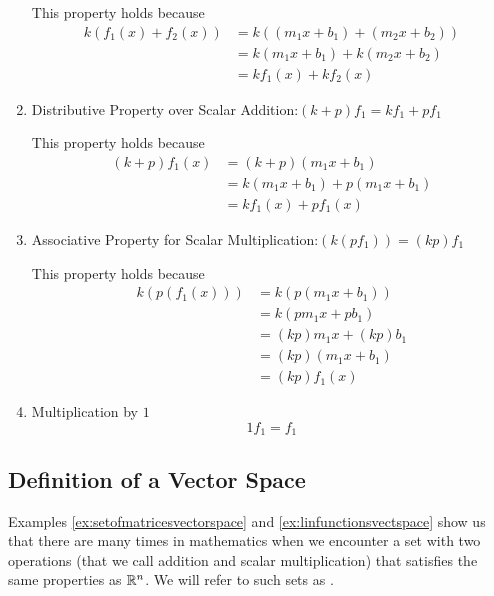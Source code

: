 \documentclass{ximera}
\begin{document}
\begin{example}
\begin{explanation}
\begin{enumerate}
  This property holds because
 \begin{align*}
  k(f_1(x) + f_2(x)) &= k((m_1 x + b_1) + (m_2 x + b_2))\\  &= k(m_1 x + b_1) + k(m_2 x + b_2)\\  &= k f_1(x) + k f_2(x)
  \end{align*}
  
  \item
  Distributive Property over Scalar Addition:\quad $(k+p)f_1=kf_1+pf_1$  
  
  This property holds because
  \begin{align*}(k+p)f_1(x)&= (k+p)(m_1 x + b_1)\\ &=k(m_1 x + b_1) + p(m_1 x + b_1)\\ &= k f_1(x) + p f_1(x)\end{align*}
 
  \item 
  Associative Property for Scalar Multiplication:\quad $(k(pf_1))=(kp)f_1$ 
  
  This property holds because
  \begin{align*}k(p(f_1(x)))&=k(p(m_1 x + b_1))\\&=k(p m_1 x +p b_1)\\ &= (kp) m_1 x + (kp) b_1\\ &= (kp)(m_1 x + b_1)\\&=(kp)f_1(x)\end{align*}
  
  \item 
  Multiplication by $1$ 
  $$1 f_1=f_1$$
  \end{enumerate}
  \end{explanation}
\end{example}

\subsection*{Definition of a Vector Space}

Examples \ref{ex:setofmatricesvectorspace} and \ref{ex:linfunctionsvectspace} show us that there are many times in mathematics when we encounter a set with two operations (that we call addition and scalar multiplication) that satisfies the same properties as $\mathbb{R}^n$.  We will refer to such sets as .
\end{document}
